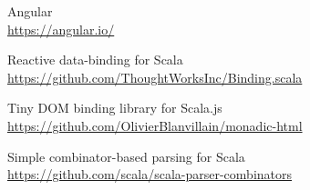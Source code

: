 \begin{thebibliography}{99}
Angular\\
\url{https://angular.io/}

Reactive data-binding for Scala\\
\url{https://github.com/ThoughtWorksInc/Binding.scala}

Tiny DOM binding library for Scala.js\\
\url{https://github.com/OlivierBlanvillain/monadic-html}

Simple combinator-based parsing for Scala\\
\url{https://github.com/scala/scala-parser-combinators}



\end{thebibliography}